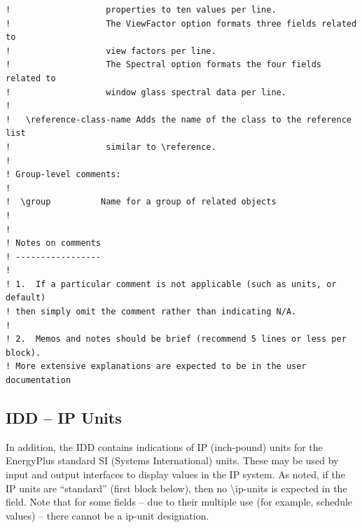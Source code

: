 \begin{lstlisting}
!                   properties to ten values per line.
!                   The ViewFactor option formats three fields related to
!                   view factors per line.
!                   The Spectral option formats the four fields related to
!                   window glass spectral data per line.
!
!   \reference-class-name Adds the name of the class to the reference list
!                   similar to \reference.
!
! Group-level comments:
!
!  \group          Name for a group of related objects
!
!
! Notes on comments
! -----------------
!
! 1.  If a particular comment is not applicable (such as units, or default)
! then simply omit the comment rather than indicating N/A.
!
! 2.  Memos and notes should be brief (recommend 5 lines or less per block).
! More extensive explanations are expected to be in the user documentation
\end{lstlisting}

\subsection{IDD -- IP Units}\label{idd-ip-units}

In addition, the IDD contains indications of IP (inch-pound) units for the EnergyPlus standard SI (Systems International) units. These may be used by input and output interfaces to display values in the IP system. As noted, if the IP units are ``standard'' (first block below), then no \textbackslash{}ip-units is expected in the field. Note that for some fields -- due to their multiple use (for example, schedule values) -- there cannot be a ip-unit designation.

